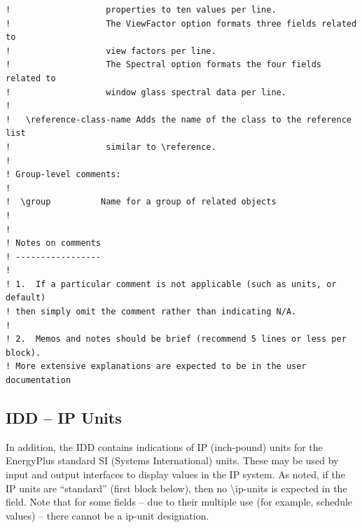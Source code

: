 \begin{lstlisting}
!                   properties to ten values per line.
!                   The ViewFactor option formats three fields related to
!                   view factors per line.
!                   The Spectral option formats the four fields related to
!                   window glass spectral data per line.
!
!   \reference-class-name Adds the name of the class to the reference list
!                   similar to \reference.
!
! Group-level comments:
!
!  \group          Name for a group of related objects
!
!
! Notes on comments
! -----------------
!
! 1.  If a particular comment is not applicable (such as units, or default)
! then simply omit the comment rather than indicating N/A.
!
! 2.  Memos and notes should be brief (recommend 5 lines or less per block).
! More extensive explanations are expected to be in the user documentation
\end{lstlisting}

\subsection{IDD -- IP Units}\label{idd-ip-units}

In addition, the IDD contains indications of IP (inch-pound) units for the EnergyPlus standard SI (Systems International) units. These may be used by input and output interfaces to display values in the IP system. As noted, if the IP units are ``standard'' (first block below), then no \textbackslash{}ip-units is expected in the field. Note that for some fields -- due to their multiple use (for example, schedule values) -- there cannot be a ip-unit designation.

